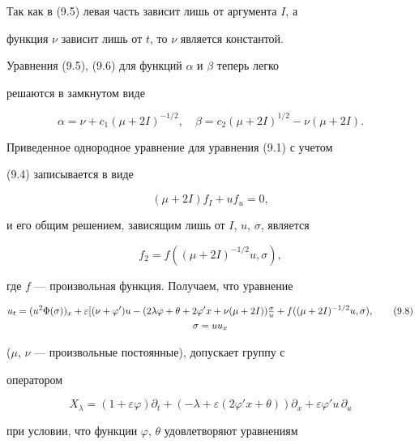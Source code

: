 Так как в (9.5) левая часть зависит лишь от аргумента $I$, а 


функция $\nu$ зависит лишь от $t$, то $\nu$ является константой. 


 


Уравнения (9.5), (9.6) для функций $\alpha$ и $\beta$ теперь легко 


решаются в замкнутом виде 


$$ 


\alpha=\nu+c_1(\mu+2I)^{-1/2},\quad 


\beta=c_2(\mu+2I)^{1/2}-\nu(\mu+2I). 


$$ 


Приведенное однородное уравнение для уравнения (9.1) с учетом 


(9.4) записывается в виде 


$$ 


(\mu+2I)f_I+u f_u=0, 


$$ 


и его общим решением, зависящим лишь от $I$, $u$, $\sigma$, является 


$$ 


f_2=f((\mu+2I)^{-1/2}u,\sigma), 


$$ 


где $f$ --- произвольная функция. Получаем, что уравнение 


\begin{gather} 


u_t=(u^2\Phi(\sigma))_x+\varepsilon[(\nu+\varphi')u 


-(2\lambda\varphi+\theta+2\varphi'x+\nu(\mu+2I)) 


\tfrac{\sigma}{u}+f((\mu+2I)^{-1/2}u,\sigma),\tag{9.8}\\ 


% 


\sigma=u u_x \notag 


\end{gather} 


($\mu$, $\nu$ --- произвольные постоянные), допускает группу с 


оператором 


$$ 


X_\lambda=(1+\varepsilon\varphi)\partial _t+(-\lambda+ 


\varepsilon(2\varphi'x+\theta))\partial _x+\varepsilon 


\varphi'u\,\partial _u 


$$ 


при условии, что функции $\varphi$, $\theta$ удовлетворяют уравнениям 


